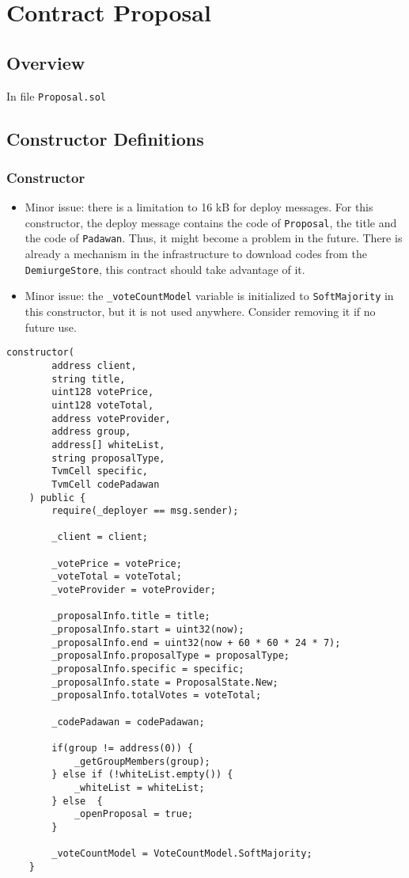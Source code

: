 
\chapter{Contract Proposal}

\minitoc

\section{Overview}


In file {\tt Proposal.sol}

\section{Constructor Definitions}


\subsection{Constructor}

\begin{itemize}
\item Minor issue: there is a limitation to 16 kB for deploy
  messages. For this constructor, the deploy message contains the code
  of {\tt Proposal}, the title and the code of {\tt Padawan}. Thus, it
  might become a problem in the future. There is already a mechanism
  in the infrastructure to download codes from the {\tt
    DemiurgeStore}, this contract should take advantage of it.
\item Minor issue: the {\tt \_voteCountModel} variable is initialized
  to {\tt SoftMajority} in this constructor, but it is not used
  anywhere. Consider removing it if no future use.
\end{itemize}

\begin{lstlisting}[firstnumber=32]
    constructor(
        address client,
        string title,
        uint128 votePrice,
        uint128 voteTotal,
        address voteProvider,
        address group,
        address[] whiteList,
        string proposalType,
        TvmCell specific,
        TvmCell codePadawan
    ) public {
        require(_deployer == msg.sender);

        _client = client;

        _votePrice = votePrice;
        _voteTotal = voteTotal;
        _voteProvider = voteProvider;

        _proposalInfo.title = title;
        _proposalInfo.start = uint32(now);
        _proposalInfo.end = uint32(now + 60 * 60 * 24 * 7);
        _proposalInfo.proposalType = proposalType;
        _proposalInfo.specific = specific;
        _proposalInfo.state = ProposalState.New;
        _proposalInfo.totalVotes = voteTotal;

        _codePadawan = codePadawan;

        if(group != address(0)) {
            _getGroupMembers(group);
        } else if (!whiteList.empty()) {
            _whiteList = whiteList;
        } else  {
            _openProposal = true;
        }

        _voteCountModel = VoteCountModel.SoftMajority;
    }
\end{lstlisting}

